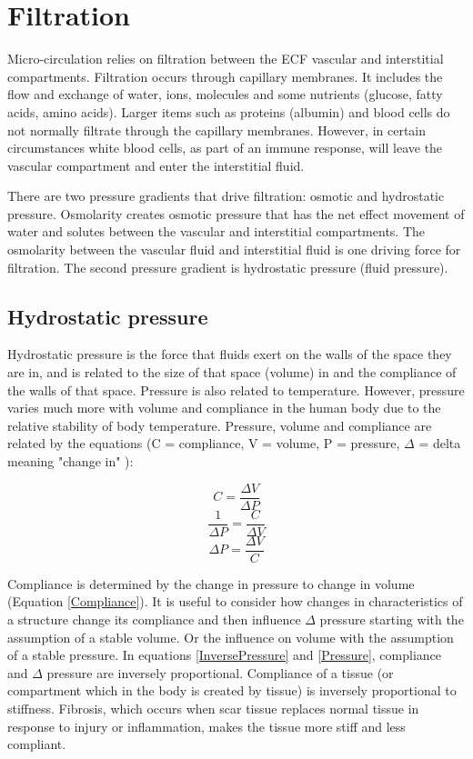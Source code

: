 \section{Filtration}

Micro-circulation relies on filtration between the ECF vascular and interstitial compartments. Filtration occurs through capillary membranes. It includes the flow and exchange of water, ions, molecules and some nutrients (glucose, fatty acids, amino acids). Larger items such as proteins (albumin) and blood cells do not normally filtrate through the capillary membranes. However, in certain circumstances white blood cells, as part of an immune response, will leave the vascular compartment and enter the interstitial fluid.

There are two pressure gradients that drive filtration: osmotic and hydrostatic pressure. Osmolarity creates osmotic pressure that has the net effect movement of water and solutes between the vascular and interstitial compartments. The osmolarity between the vascular fluid and interstitial fluid is one driving force for filtration. The second pressure gradient is hydrostatic pressure (fluid pressure). 

\subsection{Hydrostatic pressure}
Hydrostatic pressure is the force that fluids exert on the walls of the space they are in, and is related to the size of that space (volume) in and the compliance of the walls of that space. Pressure is also related to temperature. However, pressure varies much more with volume and compliance in the human body due to the relative stability of body temperature. Pressure, volume and compliance are related by the equations (C = compliance, V = volume, P = pressure, $\Delta$ = delta meaning "change in" ):

\begin{equation}
    C = \frac{\Delta V}{\Delta P}
    \label{Compliance}
\end{equation}
\begin{equation}
    \frac{1}{\Delta P} = \frac{C}{\Delta V}
    \label{InversePressure}
\end{equation}
\begin{equation}
    \Delta P = \frac{\Delta V}{C}
    \label{Pressure}
\end{equation}

Compliance is determined by the change in pressure to change in volume (Equation \ref{Compliance}). It is useful to consider how changes in characteristics of a structure change its compliance and then influence $\Delta$ pressure starting with the assumption of a stable volume. Or the influence on volume with the assumption of a stable pressure. In equations \ref{InversePressure} and \ref{Pressure}, compliance and $\Delta$ pressure are inversely proportional. Compliance of a tissue (or compartment which in the body is created by tissue) is inversely proportional to stiffness. Fibrosis, which occurs when scar tissue replaces normal tissue in response to injury or inflammation, makes the tissue more stiff and less compliant.

